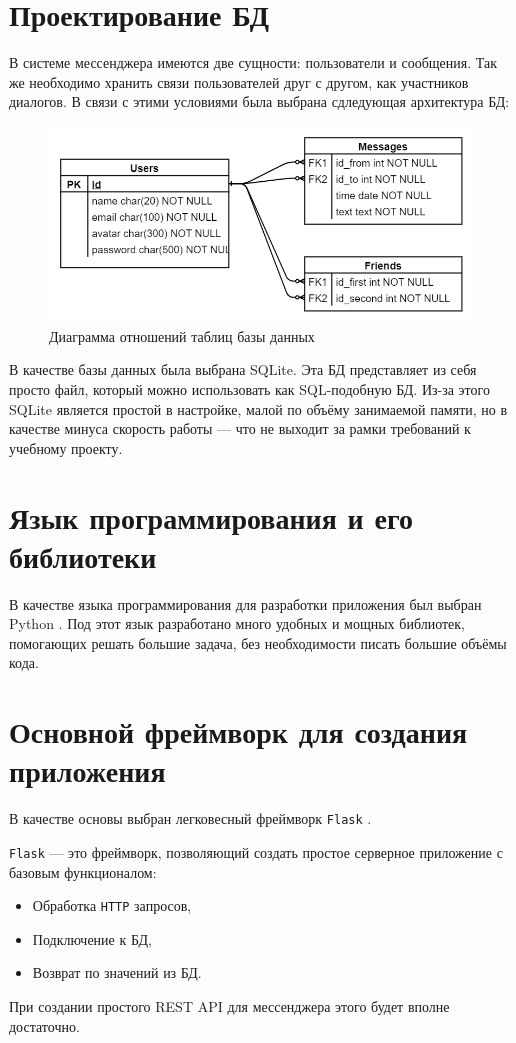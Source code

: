 \documentclass[14pt,final]{report}
\begin{document}
\section{Проектирование БД}
В системе мессенджера имеются две сущности: пользователи и сообщения. Так же необходимо хранить связи пользователей друг с другом, как участников диалогов. В связи с этими условиями была выбрана сдледующая архитектура БД:
\begin{figure}[hbtp]
  \centering
  \includegraphics[width=0.7\linewidth]{pics/db.png}
  \caption{Диаграмма отношений таблиц базы данных}
  \label{fig:db}
\end{figure}

В качестве базы данных была выбрана SQLite. Эта БД представляет из себя просто файл, который можно использовать как SQL-подобную БД. Из-за этого SQLite является простой в настройке, малой по объёму занимаемой памяти, но в качестве минуса скорость работы --- что не выходит за рамки требований к учебному проекту.

\section{Язык программирования и его библиотеки}
В качестве языка программирования для разработки приложения был выбран Python \cite{barry}. Под этот язык разработано много удобных и мощных библиотек, помогающих решать большие задача, без необходимости писать большие объёмы кода.

\section{Основной фреймворк для создания приложения}
В качестве основы выбран легковесный фреймворк \texttt{Flask} \cite{grinberg}.

\texttt{Flask} --- это фреймворк, позволяющий создать простое серверное приложение с базовым функционалом:
\begin{itemize}
    \item Обработка \texttt{HTTP} запросов,
    \item Подключение к БД,
    \item Возврат по значений из БД.
\end{itemize}
При создании простого REST API для мессенджера этого будет вполне достаточно.
\end{document}
